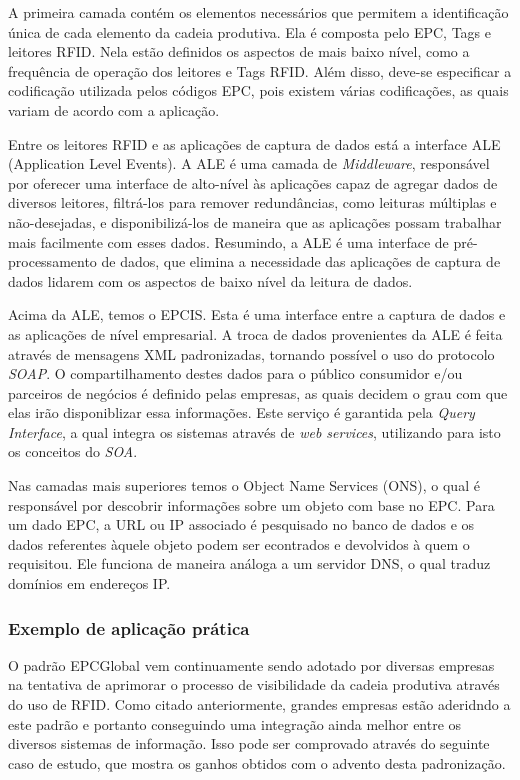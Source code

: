 	A primeira camada contém os elementos necessários que permitem a identificação única de cada elemento da cadeia produtiva. Ela é composta pelo EPC, Tags e leitores RFID. Nela estão definidos os aspectos de mais baixo nível, como a frequência de operação dos leitores e Tags RFID. Além disso, deve-se especificar a codificação utilizada pelos códigos EPC, pois existem várias codificações, as quais variam de acordo com a aplicação.
	
	Entre os leitores RFID e as aplicações de captura de dados está a interface ALE (Application Level Events). A ALE é uma camada de \textit{Middleware}, responsável por oferecer uma interface de alto-nível às aplicações capaz de agregar dados de diversos leitores, filtrá-los para remover redundâncias, como leituras múltiplas e não-desejadas, e disponibilizá-los de maneira que as aplicações possam trabalhar mais facilmente com esses dados. Resumindo, a ALE é uma interface de pré-processamento de dados, que elimina a necessidade das aplicações de captura de dados lidarem com os aspectos de baixo nível da leitura de dados.
	
	Acima da ALE, temos o EPCIS. Esta é uma interface entre a captura de dados e as aplicações de nível empresarial. A troca de dados provenientes da ALE é feita através de mensagens XML padronizadas, tornando possível o uso do protocolo \textit{SOAP}. O compartilhamento destes dados para o público consumidor e/ou parceiros de negócios é definido pelas empresas, as quais decidem o grau com que elas irão disponiblizar essa informações. Este serviço é garantida pela \textit{Query Interface}, a qual integra os sistemas através de \textit{web services}, utilizando para isto os conceitos do \textit{SOA}. 
	
	Nas camadas mais superiores temos o Object Name Services (ONS), o qual é responsável por descobrir informações sobre um objeto com base no EPC. Para um dado EPC, a URL ou IP associado é pesquisado no banco de dados e os dados referentes àquele objeto podem ser econtrados e devolvidos à quem o requisitou. Ele funciona de maneira análoga a um servidor DNS, o qual traduz domínios em endereços IP.
	
	\subsubsection{Exemplo de aplicação prática}
	O padrão EPCGlobal vem continuamente sendo adotado por diversas empresas na tentativa de aprimorar o processo de visibilidade da cadeia produtiva através do uso de RFID. Como citado anteriormente, grandes empresas estão aderidndo a este padrão e portanto conseguindo uma integração ainda melhor entre os diversos sistemas de informação. Isso pode ser comprovado através do seguinte caso de estudo, que mostra os ganhos obtidos com o advento desta padronização. 
	
